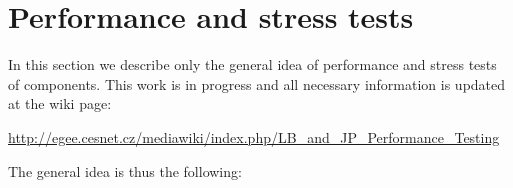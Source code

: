%
%
\section{Performance and stress tests}
\label{s:perftests}

In this section we describe only the general idea of performance and stress tests of \LB components.
This work is in progress and all necessary information is updated at the wiki page:

\begin{center}
\url{http://egee.cesnet.cz/mediawiki/index.php/LB_and_JP_Performance_Testing}
\end{center}

The general idea is thus the following:

